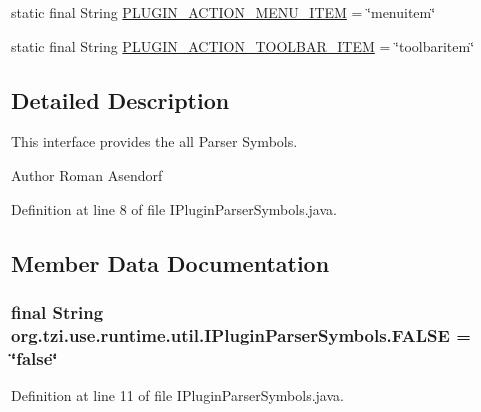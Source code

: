 \begin{DoxyCompactItemize}
\item 
static final String \hyperlink{interfaceorg_1_1tzi_1_1use_1_1runtime_1_1util_1_1_i_plugin_parser_symbols_a5649812f65f746cee11502d33cf746e3}{P\-L\-U\-G\-I\-N\-\_\-\-A\-C\-T\-I\-O\-N\-\_\-\-M\-E\-N\-U\-\_\-\-I\-T\-E\-M} = \char`\"{}menuitem\char`\"{}
\item 
static final String \hyperlink{interfaceorg_1_1tzi_1_1use_1_1runtime_1_1util_1_1_i_plugin_parser_symbols_ad26fa016811e73bfb7eb03e6c2073ab2}{P\-L\-U\-G\-I\-N\-\_\-\-A\-C\-T\-I\-O\-N\-\_\-\-T\-O\-O\-L\-B\-A\-R\-\_\-\-I\-T\-E\-M} = \char`\"{}toolbaritem\char`\"{}
\end{DoxyCompactItemize}


\subsection{Detailed Description}
This interface provides the all Parser Symbols.

\begin{DoxyAuthor}{Author}
Roman Asendorf 
\end{DoxyAuthor}


Definition at line 8 of file I\-Plugin\-Parser\-Symbols.\-java.



\subsection{Member Data Documentation}
\hypertarget{interfaceorg_1_1tzi_1_1use_1_1runtime_1_1util_1_1_i_plugin_parser_symbols_a6f1111e332b5b42c8a313c4a1c890458}{
\subsubsection[{F\-A\-L\-S\-E}]{\setlength{\rightskip}{0pt plus 5cm}final String org.\-tzi.\-use.\-runtime.\-util.\-I\-Plugin\-Parser\-Symbols.\-F\-A\-L\-S\-E = \char`\"{}false\char`\"{}\hspace{0.3cm}{\ttfamily [static]}}}\label{interfaceorg_1_1tzi_1_1use_1_1runtime_1_1util_1_1_i_plugin_parser_symbols_a6f1111e332b5b42c8a313c4a1c890458}


Definition at line 11 of file I\-Plugin\-Parser\-Symbols.\-java.

